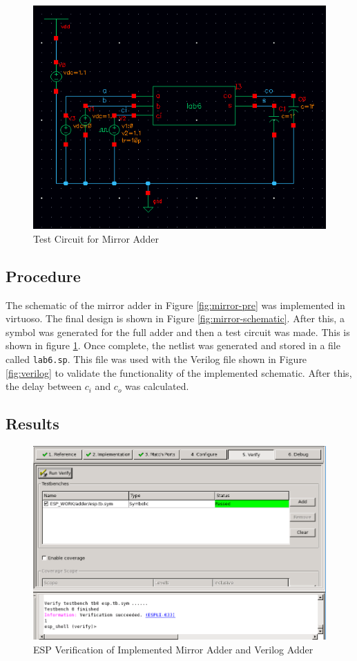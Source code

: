 \documentclass[12pt]{article}
\begin{document}
\begin{figure}[H]
\centering
\includegraphics[width=1\linewidth]{test-circuit}
\caption{Test Circuit for Mirror Adder}
\label{fig:test-circuit}
\end{figure}


\subsection{Procedure}
The schematic of the mirror adder in Figure \ref{fig:mirror-pre} was implemented in virtuoso. The final design is shown in Figure \ref{fig:mirror-schematic}. After this, a symbol was generated for the full adder and then a test circuit was made. This is shown in figure \ref{fig:test-circuit}. Once complete, the netlist was generated and stored in a file called \texttt{lab6.sp}. This file was used with the Verilog file shown in Figure \ref{fig:verilog} to validate the functionality of the implemented schematic. After this, the delay between $c_i$ and $c_o$ was calculated.
\subsection{Results}

\begin{figure}[H]
\centering
\includegraphics[width=1\linewidth]{verification}
\caption{ESP Verification of Implemented Mirror Adder and Verilog Adder}
\label{fig:verification}
\end{figure}
\end{document}
